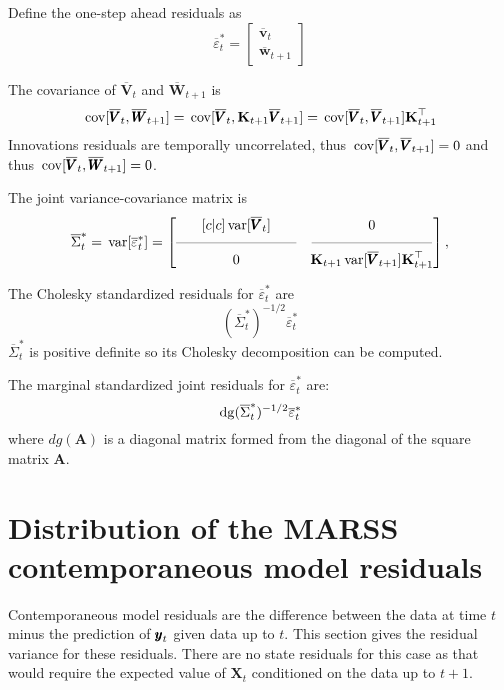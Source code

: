 \documentclass[]{article}
\def\AA{\mbox{$\mathbf A$}}	\def\aa{\mbox{$\mathbf a$}}
\def\KK{\mbox{$\mathbf K$}}
\def\VV{\mbox{$\pmb{V}$}}	\def\vv{\mbox{$\pmb{v}$}}
\def\WW{\mbox{$\pmb{W}$}}	\def\ww{\mbox{$\pmb{w}$}}
\def\XX{\mbox{$\pmb{X}$}}	\def\xx{\mbox{$\pmb{x}$}}
\def\var{\,\textup{\textrm{var}}}
\def\cov{\,\textup{\textrm{cov}}}
\def\dg{\,\textup{\textrm{dg}}}
\def\checkWtp{\overline{\WW}_{t+1}}
\def\checkwtp{\overline{\ww}_{t+1}}
\def\checkvt{\overline{\vv}_t}
\def\checkVtp{\overline{\VV}_{t+1}}
\def\checkVt{\overline{\VV}_t}
\begin{document}
Define the one-step ahead residuals as
\begin{equation}
\overline{\varepsilon}_t^* = \begin{bmatrix}\checkvt\\ \checkwtp \end{bmatrix}
\end{equation}

The covariance of $\checkVt$ and $\checkWtp$ is
\begin{equation}\label{eq:covhatVtWtp.onestep.2}
\cov[\checkVt,\checkWtp] = \cov[\checkVt,\KK_{t+1}\checkVtp] = \cov[\checkVt, \checkVtp]\KK_{t+1}^\top
\end{equation}
Innovations residuals are temporally uncorrelated, thus $\cov[\checkVt,\checkVtp]=0$ and thus $\cov[\checkVt,\checkWtp]=0$.

The joint variance-covariance matrix is
\begin{equation}\label{eq:jointcondresid.onestep2}
\overline{\Sigma}_t^* = \var[\overline{\varepsilon}_t^*] = \begin{bmatrix}[c|c]
 \var[\checkVt]&  0\\
 \rule[.5ex]{20ex}{0.25pt} & \rule[.5ex]{20ex}{0.25pt} \\
0 & \KK_{t+1}\var[\checkVtp]\KK_{t+1}^\top \end{bmatrix},
\end{equation}

The Cholesky standardized residuals for $\overline{\varepsilon}_t^*$ are
\begin{equation}
(\overline{\Sigma}_t^*)^{-1/2} \overline{\varepsilon}_t^*
\end{equation}
 $\overline{\Sigma}_t^*$ is positive definite so its Cholesky decomposition can be computed.

The marginal standardized joint residuals for $\overline{\varepsilon}_t^*$ are:
\begin{equation}
\dg(\overline{\Sigma}_t^*)^{-1/2} \overline{\varepsilon}_t^*
\end{equation}
where $dg(\AA)$ is a diagonal matrix formed from the diagonal of the square matrix $\AA$.

\section{Distribution of the MARSS contemporaneous model residuals}

Contemporaneous model residuals are the difference between the data at time $t$ minus the prediction of $\mbox{$\pmb{y}$}_t$ given data up to $t$. This section gives the residual variance for these residuals. There are no state residuals for this case as that would require the expected value of $\XX_t$ conditioned on the data up to $t+1$. 
\end{document}
